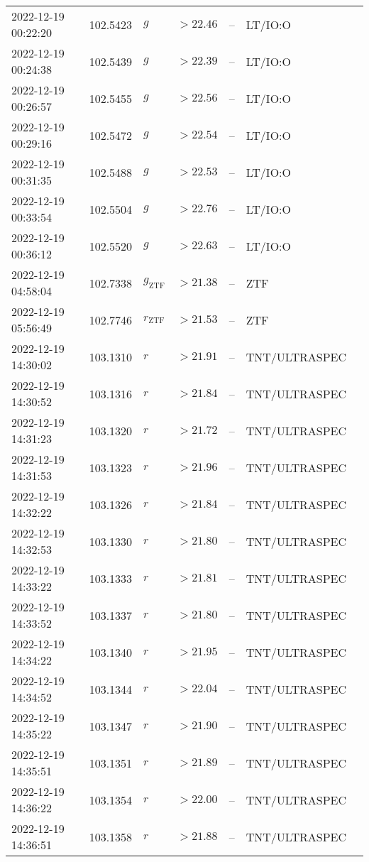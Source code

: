 \documentclass{nature_plusfigure}
\begin{document}
\begin{supplement}
\begin{center}
\begin{longtable}{lllllll}
2022-12-19 00:22:20 & 102.5423 & $g$ & $>22.46$ & -- & LT/IO:O &  \\ 
2022-12-19 00:24:38 & 102.5439 & $g$ & $>22.39$ & -- & LT/IO:O &  \\ 
2022-12-19 00:26:57 & 102.5455 & $g$ & $>22.56$ & -- & LT/IO:O &  \\ 
2022-12-19 00:29:16 & 102.5472 & $g$ & $>22.54$ & -- & LT/IO:O &  \\ 
2022-12-19 00:31:35 & 102.5488 & $g$ & $>22.53$ & -- & LT/IO:O &  \\ 
2022-12-19 00:33:54 & 102.5504 & $g$ & $>22.76$ & -- & LT/IO:O &  \\ 
2022-12-19 00:36:12 & 102.5520 & $g$ & $>22.63$ & -- & LT/IO:O &  \\ 
2022-12-19 04:58:04 & 102.7338 & ${g}_\mathrm{ZTF}$ & $>21.38$ & -- & ZTF &  \\ 
2022-12-19 05:56:49 & 102.7746 & ${r}_\mathrm{ZTF}$ & $>21.53$ & -- & ZTF &  \\ 
2022-12-19 14:30:02 & 103.1310 & $r$ & $>21.91$ & -- & TNT/ULTRASPEC &  \\ 
2022-12-19 14:30:52 & 103.1316 & $r$ & $>21.84$ & -- & TNT/ULTRASPEC &  \\ 
2022-12-19 14:31:23 & 103.1320 & $r$ & $>21.72$ & -- & TNT/ULTRASPEC &  \\ 
2022-12-19 14:31:53 & 103.1323 & $r$ & $>21.96$ & -- & TNT/ULTRASPEC &  \\ 
2022-12-19 14:32:22 & 103.1326 & $r$ & $>21.84$ & -- & TNT/ULTRASPEC &  \\ 
2022-12-19 14:32:53 & 103.1330 & $r$ & $>21.80$ & -- & TNT/ULTRASPEC &  \\ 
2022-12-19 14:33:22 & 103.1333 & $r$ & $>21.81$ & -- & TNT/ULTRASPEC &  \\ 
2022-12-19 14:33:52 & 103.1337 & $r$ & $>21.80$ & -- & TNT/ULTRASPEC &  \\ 
2022-12-19 14:34:22 & 103.1340 & $r$ & $>21.95$ & -- & TNT/ULTRASPEC &  \\ 
2022-12-19 14:34:52 & 103.1344 & $r$ & $>22.04$ & -- & TNT/ULTRASPEC &  \\ 
2022-12-19 14:35:22 & 103.1347 & $r$ & $>21.90$ & -- & TNT/ULTRASPEC &  \\ 
2022-12-19 14:35:51 & 103.1351 & $r$ & $>21.89$ & -- & TNT/ULTRASPEC &  \\ 
2022-12-19 14:36:22 & 103.1354 & $r$ & $>22.00$ & -- & TNT/ULTRASPEC &  \\ 
2022-12-19 14:36:51 & 103.1358 & $r$ & $>21.88$ & -- & TNT/ULTRASPEC &  \\ 

\end{longtable}
\end{center}
\end{supplement}
\end{document}
